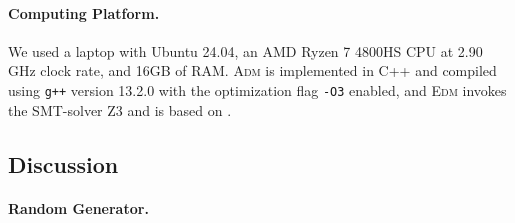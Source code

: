 
\paragraph*{Computing Platform.}
We used a laptop with Ubuntu 24.04, an AMD Ryzen 7 4800HS CPU at 2.90 GHz clock rate, and 16GB of RAM.
\textsc{Adm} is implemented in C++ and compiled using \texttt{g++} version 13.2.0 with the optimization flag \texttt{-O3} enabled, and \textsc{Edm} invokes the SMT-solver Z3 \cite{MouraB08} and is based on \cite{MomtazAB23}.

\subsection{Discussion}

\paragraph*{Random Generator.}

